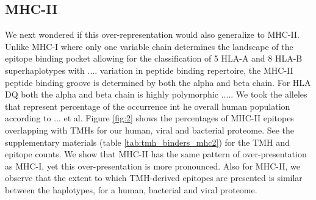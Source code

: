 \subsection{MHC-II}

We next wondered if this over-representation would also generalize to MHC-II. 
Unlike MHC-I where only one variable chain determines the landscape of the epitope binding pocket allowing for the classification of 5 HLA-A and 8 HLA-B superhaplotypes with .... variation in peptide binding repertoire, the MHC-II peptide binding groove is determined by both the alpha and beta chain. For HLA DQ both the alpha and beta chain is highly polymorphic  ..... 
We took the alleles that represent percentage of the occurrence int he overall human population according to ... et al. 
Figure \ref{fig:2} shows the percentages of MHC-II epitopes overlapping 
with TMHs for our human, viral and bacterial proteome.
See the supplementary materials (table \ref{tab:tmh_binders_mhc2}) 
for the TMH and epitope counts.
We show that MHC-II has the same pattern of over-presentation
as MHC-I, yet this over-presentation is more pronounced. 
Also for MHC-II, we observe that the extent to which TMH-derived
epitopes are presented is similar between the haplotypes, for
a human, bacterial and viral proteome.

